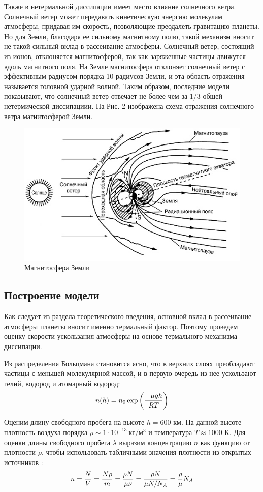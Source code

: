 \documentclass[12pt,a4paper]{article}
\begin{document}
Также в нетермальной диссипации имеет место влияние солнечного ветра. 
Солнечный ветер может передавать кинетическую энергию молекулам атмосферы, придавая им скорость, позволяющие преодалеть гравитацию планеты.
Но для Земли, благодаря ее сильному магнитному полю, такой механизм вносит не такой сильный вклад в рассеивание атмосферы.
Солнечный ветер, состоящий из ионов, отклоняется магнитосферой, так как заряженные частицы движутся вдоль магнитного поля. 
На Земле магнитосфера отклоняет солнечный ветер с эффективным радиусом порядка 10 радиусов Земли, и эта область отражения называется головной ударной волной.
Таким образом, последние модели показывают, что солнечный ветер отвечает не более чем за 1/3 общей нетермической диссипациии. \cite{wiki_leak} 
На Рис. 2 изображена схема отражения солнечного ветра магнитосферой Земли.

\begin{figure}[h!]
    \centering
    \includegraphics[width=0.65\linewidth]{magnetosphere.jpeg}
    \caption{Магнитосфера Земли \cite{magnet}}
\end{figure}

\newpage

\subsection*{Построение модели}
Как следует из раздела теоретического введения, основной вклад в рассеивание атмосферы планеты вносит именно термальный фактор.
Поэтому проведем оценку скорости ускользания атмосферы на основе термального механизма диссипации.

Из распределения Больцмана становится ясно, что в верхних слоях преобладают частицы с меньшей молекулярной массой, и в первую очередь из нее ускользают гелий, водород и атомарный водород:
\begin{equation}
    n(h) = n_0 \exp{\left(-\mu gh \over RT\right)}
\end{equation}

Оценим длину свободного пробега на высоте $h = 600$ км. 
На данной высоте плотность воздуха порядка $\rho \sim 1 \cdot 10^{-13}\ кг/м^3$ и температура $T \approx 1000$ К. 
Для оценки длины свободного пробега $\lambda$ выразим концентрацию $n$ как функцию от плотности $\rho$, чтобы использовать табличными значения плотности из открытых источников \cite{wiki_standart}:
\begin{equation*}
    n = {N \over V} = {N\rho \over m} = {\rho N \over \mu \nu} = {\rho N \over \mu N/N_A} = {\rho \over \mu}N_A
\end{equation*}
\end{document}
